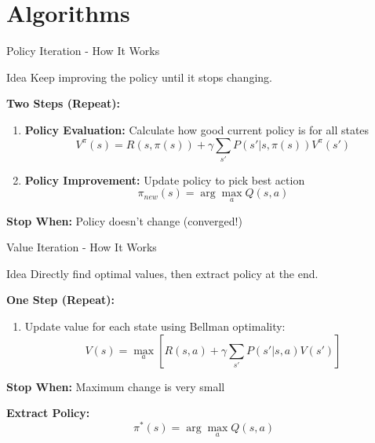 \documentclass[aspectratio=169]{beamer}
\begin{document}
\section{Algorithms}

\begin{frame}{Policy Iteration - How It Works}
    \begin{block}{Idea}
        Keep improving the policy until it stops changing.
    \end{block}
    
    \vspace{0.3cm}
    
    \textbf{Two Steps (Repeat):}
    \begin{enumerate}
        \item \textbf{Policy Evaluation:} Calculate how good current policy is for all states
        \[V^\pi(s) = R(s, \pi(s)) + \gamma \sum_{s'} P(s'|s, \pi(s)) V^\pi(s')\]
        
        \item \textbf{Policy Improvement:} Update policy to pick best action
        \[\pi_{new}(s) = \arg\max_a Q(s, a)\]
    \end{enumerate}
    
    \vspace{0.3cm}
    
    \textbf{Stop When:} Policy doesn't change (converged!)
\end{frame}

\begin{frame}{Value Iteration - How It Works}
    \begin{block}{Idea}
        Directly find optimal values, then extract policy at the end.
    \end{block}
    
    \vspace{0.3cm}
    
    \textbf{One Step (Repeat):}
    \begin{enumerate}
        \item Update value for each state using Bellman optimality:
        \[V(s) = \max_a \left[ R(s, a) + \gamma \sum_{s'} P(s'|s, a) V(s') \right]\]
    \end{enumerate}
    
    \vspace{0.3cm}
    
    \textbf{Stop When:} Maximum change is very small
    
    \vspace{0.3cm}
    
    \textbf{Extract Policy:}
    \[\pi^*(s) = \arg\max_a Q(s, a)\]
\end{frame}
\end{document}
